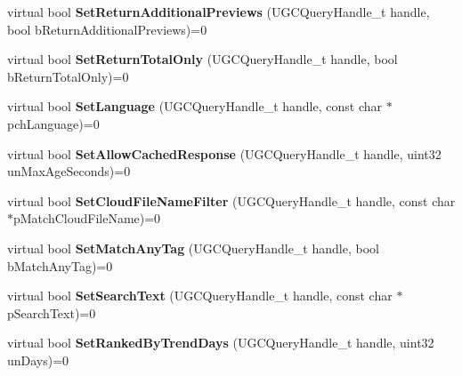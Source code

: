 \begin{DoxyCompactItemize}
\item 
\hypertarget{classISteamUGC_af98edfb1b11036ac2fff38b8b3df0fed}{}virtual bool {\bfseries Set\+Return\+Additional\+Previews} (U\+G\+C\+Query\+Handle\+\_\+t handle, bool b\+Return\+Additional\+Previews)=0\label{classISteamUGC_af98edfb1b11036ac2fff38b8b3df0fed}

\item 
\hypertarget{classISteamUGC_a15c09b0b9caa320897080ae9eb624275}{}virtual bool {\bfseries Set\+Return\+Total\+Only} (U\+G\+C\+Query\+Handle\+\_\+t handle, bool b\+Return\+Total\+Only)=0\label{classISteamUGC_a15c09b0b9caa320897080ae9eb624275}

\item 
\hypertarget{classISteamUGC_aea7606518df5ea1f1a94755b23849821}{}virtual bool {\bfseries Set\+Language} (U\+G\+C\+Query\+Handle\+\_\+t handle, const char $\ast$pch\+Language)=0\label{classISteamUGC_aea7606518df5ea1f1a94755b23849821}

\item 
\hypertarget{classISteamUGC_af213273049e39eb92cbaf633c3467afe}{}virtual bool {\bfseries Set\+Allow\+Cached\+Response} (U\+G\+C\+Query\+Handle\+\_\+t handle, uint32 un\+Max\+Age\+Seconds)=0\label{classISteamUGC_af213273049e39eb92cbaf633c3467afe}

\item 
\hypertarget{classISteamUGC_adee0967c96cc09064eb1a385cb7183cf}{}virtual bool {\bfseries Set\+Cloud\+File\+Name\+Filter} (U\+G\+C\+Query\+Handle\+\_\+t handle, const char $\ast$p\+Match\+Cloud\+File\+Name)=0\label{classISteamUGC_adee0967c96cc09064eb1a385cb7183cf}

\item 
\hypertarget{classISteamUGC_a2c2ff75b522ef2a757bf62cabf02dd15}{}virtual bool {\bfseries Set\+Match\+Any\+Tag} (U\+G\+C\+Query\+Handle\+\_\+t handle, bool b\+Match\+Any\+Tag)=0\label{classISteamUGC_a2c2ff75b522ef2a757bf62cabf02dd15}

\item 
\hypertarget{classISteamUGC_a199a70a52fdec017d9a4eed2cc692c11}{}virtual bool {\bfseries Set\+Search\+Text} (U\+G\+C\+Query\+Handle\+\_\+t handle, const char $\ast$p\+Search\+Text)=0\label{classISteamUGC_a199a70a52fdec017d9a4eed2cc692c11}

\item 
\hypertarget{classISteamUGC_a63ed9c33d52cfb5c837d2194c0b16906}{}virtual bool {\bfseries Set\+Ranked\+By\+Trend\+Days} (U\+G\+C\+Query\+Handle\+\_\+t handle, uint32 un\+Days)=0\label{classISteamUGC_a63ed9c33d52cfb5c837d2194c0b16906}


\end{DoxyCompactItemize}
